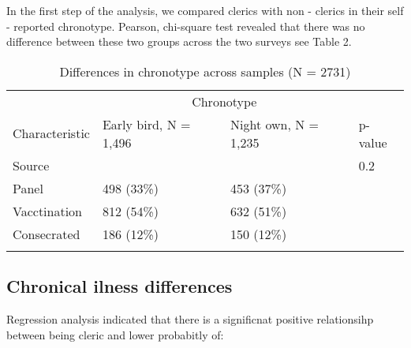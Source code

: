 \documentclass[ijerph,article,accept,moreauthors,pdftex]{mdpi}
\begin{document}
In the first step of the analysis, we compared clerics with non -
clerics in their self - reported chronotype. Pearson, chi-square test
revealed that there was no difference between these two groups across
the two surveys see Table 2.

\begin{table}[!h]

\caption{\label{tab:contingenty tables}Differences in chronotype across samples (N = 2731)}
\centering
\begin{tabular}[t]{llll}
\toprule
\multicolumn{1}{c}{ } & \multicolumn{2}{c}{Chronotype} & \multicolumn{1}{c}{ } \\
\cmidrule(l{3pt}r{3pt}){2-3}{}
Characteristic & Early bird, N = 1,496 & Night own, N = 1,235 & p-value\\
\midrule{}
Source &  &  & 0.2\\
\hspace{1em}Panel & 498 (33\%) & 453 (37\%) & \\
\hspace{1em}Vacctination & 812 (54\%) & 632 (51\%) & \\
\hspace{1em}Consecrated & 186 (12\%) & 150 (12\%) & \\
\bottomrule{}
\end{tabular}
\end{table}

\hypertarget{chronical-ilness-differences}{%
\subsection{Chronical ilness
differences}\label{chronical-ilness-differences}}

Regression analysis indicated that there is a significnat positive
relationsihp between being cleric and lower probabitly of:
\end{document}

